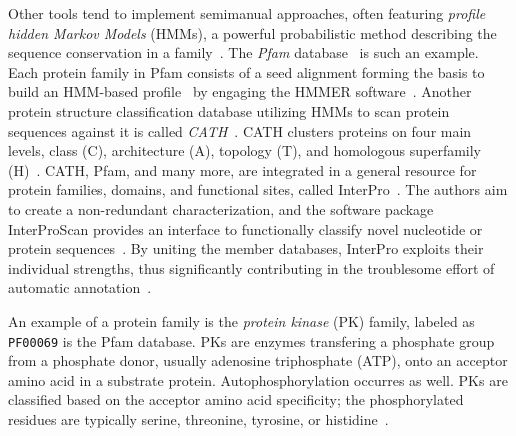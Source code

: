   Other tools tend to implement semimanual approaches, often featuring
  \emph{profile hidden Markov Models} (HMMs), a powerful probabilistic method describing
  the sequence conservation in a family~\cite{krogh1994hidden, eddy1996hidden}.
  The \emph{Pfam} database~\cite{sonnhammer1997pfam} is such an example.
  Each protein family in Pfam consists of a seed alignment forming the basis to
  build an HMM-based profile~\cite{el2019pfam} by engaging the HMMER
  software~\cite{finn2010pfam, finn2011hmmer}.
  Another protein structure classification database utilizing HMMs to scan protein
  sequences against it is called \emph{CATH}~\cite{dawson2017cath}.
  CATH clusters proteins on four main levels, class (C), architecture (A), topology (T),
  and homologous superfamily (H)~\cite{orengo1997cath}.
  CATH, Pfam, and many more, are integrated in a general resource for protein families,
  domains, and functional sites, called InterPro~\cite{finn2017interpro}.
  The authors aim to create a non-redundant characterization, and the software package
  InterProScan provides an interface to functionally classify novel nucleotide or protein
  sequences~\cite{zdobnov2001interproscan}.
  By uniting the member databases, InterPro exploits their individual strengths, thus
  significantly contributing in the troublesome effort of automatic
  annotation~\cite{apweiler2000interpro}.


\label{intro:pkinase}

  An example of a protein family is the \emph{protein kinase} (PK) family, labeled as
  \texttt{PF00069} is the Pfam database.
  PKs are enzymes transfering a phosphate group from a phosphate donor, usually
  adenosine triphosphate (ATP), onto an acceptor amino acid in a substrate protein.
  Autophosphorylation occurres as well.
  PKs are classified based on the acceptor amino acid specificity; the phosphorylated
  residues are typically serine, threonine, tyrosine, or histidine~\cite{hunter19911}.

